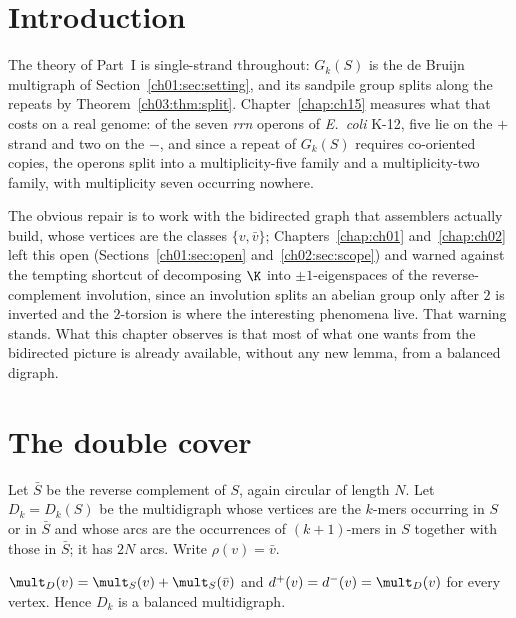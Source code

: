 \section{Introduction}\label{ch05:sec:intro}

The theory of Part~I is single-strand throughout: $G_k(S)$ is the de Bruijn multigraph of
Section~\ref{ch01:sec:setting}, and its sandpile group splits along the repeats by
Theorem~\ref{ch03:thm:split}. Chapter~\ref{chap:ch15} measures what that costs on a real genome: of the seven \emph{rrn} operons
of \emph{E.\ coli} K-12, five lie on the $+$ strand and two on the $-$, and since a repeat
of $G_k(S)$ requires co-oriented copies, the operons split into a multiplicity-five family
and a multiplicity-two family, with multiplicity seven occurring nowhere.

The obvious repair is to work with the bidirected graph that assemblers actually build,
whose vertices are the classes $\{v,\bar v\}$; Chapters~\ref{chap:ch01} and~\ref{chap:ch02} left this open
(Sections~\ref{ch01:sec:open} and~\ref{ch02:sec:scope}) and warned
against the tempting shortcut of decomposing $\K$ into $\pm1$-eigenspaces of the
reverse-complement involution, since an involution splits an abelian group only after $2$
is inverted and the $2$-torsion is where the interesting phenomena live. That warning
stands. What this chapter observes is that most of what one wants from the bidirected picture
is already available, without any new lemma, from a balanced digraph.

\section{The double cover}\label{ch05:sec:cover}

\begin{definition}\label{ch05:def:cover}
Let $\bar S$ be the reverse complement of $S$, again circular of length $N$. Let
$D_k=D_k(S)$ be the multidigraph whose vertices are the $k$-mers occurring in $S$ or in
$\bar S$ and whose arcs are the occurrences of $(k{+}1)$-mers in $S$ together with those
in $\bar S$; it has $2N$ arcs. Write $\rho(v)=\bar v$.
\end{definition}

\begin{lemma}[Balance]\label{ch05:lem:balance}
$\mult_{D}(v)=\mult_S(v)+\mult_S(\bar v)$ and $d^{+}(v)=d^{-}(v)=\mult_D(v)$ for every
vertex. Hence $D_k$ is a balanced multidigraph.
\end{lemma}


